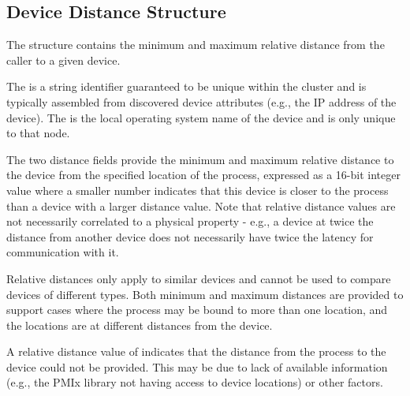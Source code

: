 \subsection{Device Distance Structure}

The  structure contains the minimum and maximum relative distance from the caller to a given device.


The  is a string identifier guaranteed to be unique within the cluster and is typically assembled from discovered device attributes (e.g., the \ac{IP} address of the device). The  is the local operating system name of the device and is only unique to that node.

The two distance fields provide the minimum and maximum relative distance to the device from the specified location of the process, expressed as a 16-bit integer value where a smaller number indicates that this device is closer to the process than a device with a larger distance value. Note that relative distance values are not necessarily correlated to a physical property - e.g., a device at twice the distance from another device does not necessarily have twice the latency for communication with it.

Relative distances only apply to similar devices and cannot be used to compare devices of different types. Both minimum and maximum distances are provided to support cases where the process may be bound to more than one location, and the locations are at different distances from the device.

A relative distance value of  indicates that the distance from the process to the device could not be provided. This may be due to lack of available information (e.g., the \ac{PMIx} library not having access to device locations) or other factors.


